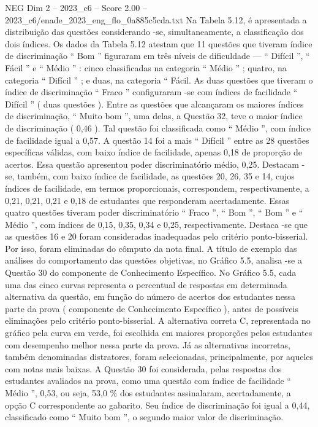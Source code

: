\begin{textsample}{NEG Dim 2 – 2023\_c6 – Score 2.00 – 2023\_c6/enade\_2023\_eng\_flo\_0a885c5cda.txt}
Na Tabela 5.12, é apresentada a distribuição das questões considerando -se, simultaneamente, a classificação dos dois índices.
Os dados da Tabela 5.12 atestam que 11 questões que tiveram índice de discriminação “ Bom ” figuraram em três níveis de dificuldade — “ Difícil ”, “ Fácil ” e “ Médio ” : cinco classificadas na categoria “ Médio ” ; quatro, na categoria “ Difícil ” ; e duas, na categoria “ Fácil.
As duas questões que tiveram o índice de discriminação “ Fraco ” configuraram -se com índices de facilidade “ Difícil ” ( duas questões ).
Entre as questões que alcançaram os maiores índices de discriminação, “ Muito bom ”, uma delas, a Questão 32, teve o maior índice de discriminação ( 0,46 ).
Tal questão foi classificada como “ Médio ”, com índice de facilidade igual a 0,57.
A questão 14 foi a mais “ Difícil ” entre as 28 questões específicas válidas, com baixo índice de facilidade, apenas 0,18 de proporção de acertos.
Essa questão apresentou poder discriminatório médio, 0,25.
Destacam -se, também, com baixo índice de facilidade, as questões 20, 26, 35 e 14, cujos índices de facilidade, em termos proporcionais, correspondem, respectivamente, a 0,21, 0,21, 0,21 e 0,18 de estudantes que responderam acertadamente.
Essas quatro questões tiveram poder discriminatório “ Fraco ”, “ Bom ”, “ Bom ” e “ Médio ”, com índices de 0,15, 0,35, 0,34 e 0,25, respectivamente.
Destaca -se que as questões 16 e 20 foram consideradas inadequadas pelo critério ponto-bisserial.
Por isso, foram eliminadas do cômputo da nota final.
A título de exemplo das análises do comportamento das questões objetivas, no Gráfico 5.5, analisa -se a Questão 30 do componente de Conhecimento Específico.
No Gráfico 5.5, cada uma das cinco curvas representa o percentual de respostas em determinada alternativa da questão, em função do número de acertos dos estudantes nessa parte da prova ( componente de Conhecimento Específico ), antes de possíveis eliminações pelo critério ponto-bisserial.
A alternativa correta C, representada no gráfico pela curva em verde, foi escolhida em maiores proporções pelos estudantes com desempenho melhor nessa parte da prova.
Já as alternativas incorretas, também denominadas distratores, foram selecionadas, principalmente, por aqueles com notas mais baixas.
A Questão 30 foi considerada, pelas respostas dos estudantes avaliados na prova, como uma questão com índice de facilidade “ Médio ”, 0,53, ou seja, 53,0 \% dos estudantes assinalaram, acertadamente, a opção C correspondente ao gabarito.
Seu índice de discriminação foi igual a 0,44, classificado como “ Muito bom ”, o segundo maior valor de discriminação.

\end{textsample}
